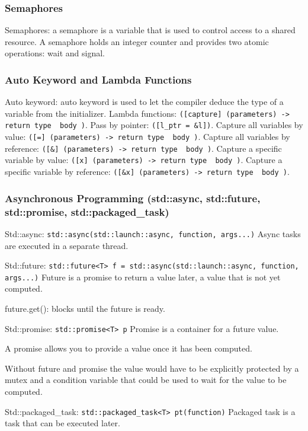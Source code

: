 \documentclass{article}
\begin{document}
\subsubsection*{Semaphores}
Semaphores: a semaphore is a variable that is used to control access to a shared resource.
A semaphore holds an integer counter and provides two atomic operations: wait and signal.

\subsubsection*{Auto Keyword and Lambda Functions}
Auto keyword: auto keyword is used to let the compiler deduce the type of a variable from the initializer.
Lambda functions: \texttt{([capture] (parameters) -> return type { body })}.
Pass by pointer: \texttt{([l\_ptr = \&l])}.
Capture all variables by value: \texttt{([=] (parameters) -> return type { body })}.
Capture all variables by reference: \texttt{([\&] (parameters) -> return type { body })}.
Capture a specific variable by value: \texttt{([x] (parameters) -> return type { body })}.
Capture a specific variable by reference: \texttt{([\&x] (parameters) -> return type { body })}. 

\subsubsection*{Asynchronous Programming (std::async, std::future, std::promise, std::packaged\_task)}
Std::async: \texttt{std::async(std::launch::async, function, args...)}
Async tasks are executed in a separate thread.

Std::future: \texttt{std::future<T> f = std::async(std::launch::async, function, args...)}
Future is a promise to return a value later, a value that is not yet computed.

future.get(): blocks until the future is ready.

Std::promise: \texttt{std::promise<T> p}
Promise is a container for a future value.

A promise allows you to provide a value once it has been computed.

Without future and promise the value would have to be explicitly protected by a 
mutex and a condition variable that could be used to wait for the value to be computed.

Std::packaged\_task: \texttt{std::packaged\_task<T> pt(function)}
Packaged task is a task that can be executed later.
\end{document}
